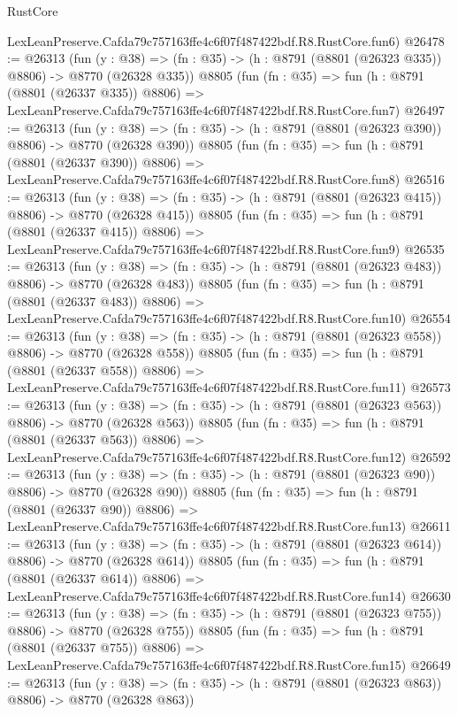 \begin{lexlean}{RustCore}
\begin{coremodule}
    LexLeanPreserve.Cafda79c757163ffe4c6f07f487422bdf.R8.RustCore.fun6)
@26478 := @26313
    (fun (y : @38) => (fn : @35) -> (h : @8791 (@8801 (@26323 @335)) @8806) -> @8770 (@26328 @335))
    @8805
    (fun (fn : @35) =>
    fun (h : @8791 (@8801 (@26337 @335)) @8806) =>
    LexLeanPreserve.Cafda79c757163ffe4c6f07f487422bdf.R8.RustCore.fun7)
@26497 := @26313
    (fun (y : @38) => (fn : @35) -> (h : @8791 (@8801 (@26323 @390)) @8806) -> @8770 (@26328 @390))
    @8805
    (fun (fn : @35) =>
    fun (h : @8791 (@8801 (@26337 @390)) @8806) =>
    LexLeanPreserve.Cafda79c757163ffe4c6f07f487422bdf.R8.RustCore.fun8)
@26516 := @26313
    (fun (y : @38) => (fn : @35) -> (h : @8791 (@8801 (@26323 @415)) @8806) -> @8770 (@26328 @415))
    @8805
    (fun (fn : @35) =>
    fun (h : @8791 (@8801 (@26337 @415)) @8806) =>
    LexLeanPreserve.Cafda79c757163ffe4c6f07f487422bdf.R8.RustCore.fun9)
@26535 := @26313
    (fun (y : @38) => (fn : @35) -> (h : @8791 (@8801 (@26323 @483)) @8806) -> @8770 (@26328 @483))
    @8805
    (fun (fn : @35) =>
    fun (h : @8791 (@8801 (@26337 @483)) @8806) =>
    LexLeanPreserve.Cafda79c757163ffe4c6f07f487422bdf.R8.RustCore.fun10)
@26554 := @26313
    (fun (y : @38) => (fn : @35) -> (h : @8791 (@8801 (@26323 @558)) @8806) -> @8770 (@26328 @558))
    @8805
    (fun (fn : @35) =>
    fun (h : @8791 (@8801 (@26337 @558)) @8806) =>
    LexLeanPreserve.Cafda79c757163ffe4c6f07f487422bdf.R8.RustCore.fun11)
@26573 := @26313
    (fun (y : @38) => (fn : @35) -> (h : @8791 (@8801 (@26323 @563)) @8806) -> @8770 (@26328 @563))
    @8805
    (fun (fn : @35) =>
    fun (h : @8791 (@8801 (@26337 @563)) @8806) =>
    LexLeanPreserve.Cafda79c757163ffe4c6f07f487422bdf.R8.RustCore.fun12)
@26592 := @26313
    (fun (y : @38) => (fn : @35) -> (h : @8791 (@8801 (@26323 @90)) @8806) -> @8770 (@26328 @90))
    @8805
    (fun (fn : @35) =>
    fun (h : @8791 (@8801 (@26337 @90)) @8806) =>
    LexLeanPreserve.Cafda79c757163ffe4c6f07f487422bdf.R8.RustCore.fun13)
@26611 := @26313
    (fun (y : @38) => (fn : @35) -> (h : @8791 (@8801 (@26323 @614)) @8806) -> @8770 (@26328 @614))
    @8805
    (fun (fn : @35) =>
    fun (h : @8791 (@8801 (@26337 @614)) @8806) =>
    LexLeanPreserve.Cafda79c757163ffe4c6f07f487422bdf.R8.RustCore.fun14)
@26630 := @26313
    (fun (y : @38) => (fn : @35) -> (h : @8791 (@8801 (@26323 @755)) @8806) -> @8770 (@26328 @755))
    @8805
    (fun (fn : @35) =>
    fun (h : @8791 (@8801 (@26337 @755)) @8806) =>
    LexLeanPreserve.Cafda79c757163ffe4c6f07f487422bdf.R8.RustCore.fun15)
@26649 := @26313
    (fun (y : @38) => (fn : @35) -> (h : @8791 (@8801 (@26323 @863)) @8806) -> @8770 (@26328 @863))

\end{coremodule}
\end{lexlean}
